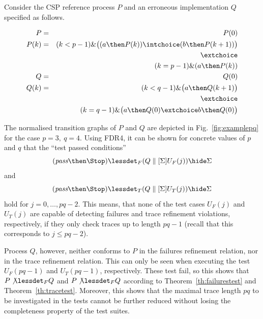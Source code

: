 \begin{example}\label{ex:pq}
Consider 
the CSP reference process $P$ and an erroneous implementation $Q$
specified as follows.

\begin{eqnarray*}
P & = &  P(0)
\\
P(k) & = & (k < p-1) \& \big( (a \then P(k)) \intchoice ( b \then P(k+1))\big)
\\ & & \extchoice
\\ & & (k = p-1) \& (a \then P(k))
\\
Q & = & Q(0)
\\
Q(k) & = & (k < q-1) \& \big( a \then Q(k+1)    \big) 
\\ & & \extchoice
\\ & & ( k = q-1)\& \big( a\then Q(0) \extchoice b\then Q(0)  \big)
\end{eqnarray*}



\medskip
The normalised transition graphs of $P$ and $Q$ are depicted in Fig.~\ref{fig:examplepq}
for the case $p=3,\ q=4$. Using FDR4, it can be shown for concrete values of
$p$ and $q$ that the  ``test passed conditions''
\[
(\epass\then\Stop) \lessdet_F (Q\parallel[\Sigma] U_F(j))\hide \Sigma
\]
and
\[
(\epass\then\Stop) \lessdet_T (Q\parallel[\Sigma] U_T(j))\hide \Sigma
\]
hold for $j = 0,\dots,pq-2$. This means, that none of the test cases $U_F(j)$
and $U_T(j)$ are capable of detecting failures and trace refinement violations, 
respectively, if they only check traces up to length $pq-1$ (recall that this
corresponds to $j\le pq-2$). 

Process $Q$, however, neither conforms to $P$ in the failures refinement 
relation, nor in the trace
refinement relation. This can only be seen when executing the test $U_F(pq-1)$ and
$U_T(pq-1)$, respectively. These test fail, so this shows that $P\not\lessdet_F Q$ and
$P\not\lessdet_F Q$ according to Theorem~\ref{th:failurestest} and Theorem~\ref{th:tracetest}. Moreover, this shows that
the maximal trace
length $pq$ to be investigated in the tests cannot be further reduced without losing
the completeness property of the test suites.
\xbox
\end{example}

